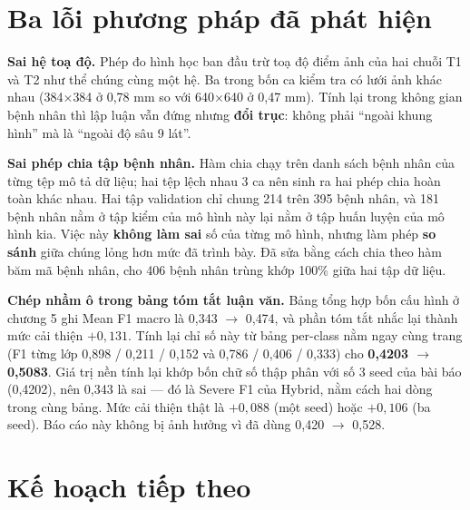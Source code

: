 \documentclass[11pt,a4paper]{article}
\begin{document}
\section{Ba lỗi phương pháp đã phát hiện}

\textbf{Sai hệ toạ độ.} Phép đo hình học ban đầu trừ toạ độ điểm ảnh của hai chuỗi T1 và T2 như thể
chúng cùng một hệ. Ba trong bốn ca kiểm tra có lưới ảnh khác nhau (384$\times$384 ở 0{,}78 mm so với
640$\times$640 ở 0{,}47 mm). Tính lại trong không gian bệnh nhân thì lập luận vẫn đứng nhưng
\textbf{đổi trục}: không phải ``ngoài khung hình'' mà là ``ngoài độ sâu 9 lát''.

\textbf{Sai phép chia tập bệnh nhân.} Hàm chia chạy trên danh sách bệnh nhân của từng tệp mô tả dữ
liệu; hai tệp lệch nhau 3 ca nên sinh ra hai phép chia hoàn toàn khác nhau. Hai tập validation chỉ
chung 214 trên 395 bệnh nhân, và 181 bệnh nhân nằm ở tập kiểm của mô hình này lại nằm ở tập huấn
luyện của mô hình kia. Việc này \textbf{không làm sai} số của từng mô hình, nhưng làm phép
\textbf{so sánh} giữa chúng lỏng hơn mức đã trình bày. Đã sửa bằng cách chia theo hàm băm mã bệnh
nhân, cho 406 bệnh nhân trùng khớp 100\% giữa hai tập dữ liệu.

\textbf{Chép nhầm ô trong bảng tóm tắt luận văn.} Bảng tổng hợp bốn cấu hình ở chương 5 ghi Mean
F1 macro là 0{,}343 $\to$ 0{,}474, và phần tóm tắt nhắc lại thành mức cải thiện $+0{,}131$. Tính
lại chỉ số này từ bảng per-class nằm ngay cùng trang (F1 từng lớp 0{,}898 / 0{,}211 / 0{,}152 và
0{,}786 / 0{,}406 / 0{,}333) cho \textbf{0{,}4203 $\to$ 0{,}5083}. Giá trị nền tính lại khớp bốn
chữ số thập phân với số 3 seed của bài báo (0{,}4202), nên 0{,}343 là sai --- đó là Severe F1 của
Hybrid, nằm cách hai dòng trong cùng bảng. Mức cải thiện thật là $+0{,}088$ (một seed) hoặc
$+0{,}106$ (ba seed). Báo cáo này không bị ảnh hưởng vì đã dùng 0{,}420 $\to$ 0{,}528.

\section{Kế hoạch tiếp theo}
\end{document}
